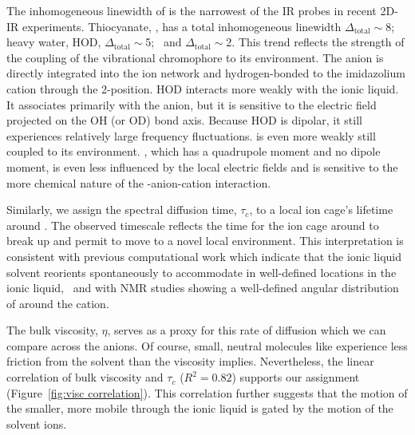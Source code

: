 The inhomogeneous linewidth of  is the narrowest of the IR probes in recent 2D-IR experiments. Thiocyanate, , has a total inhomogeneous linewidth $\Delta_\mathrm{total}\sim$\SI{8}{\wavenumber};\cite{Ren2014} heavy water, HOD, $\Delta_\mathrm{total}\sim$\SI{5}{\wavenumber};~\cite{wongJPCB-13} and  $\Delta_\mathrm{total}\sim$\SI{2}{\wavenumber}. This trend reflects the strength of the coupling of the vibrational chromophore to its environment. The  anion is directly integrated into the ion network and hydrogen-bonded to the imidazolium cation through the 2-position. HOD interacts more weakly with the ionic liquid. It associates primarily with the anion, but it is sensitive to the electric field projected on the OH (or OD) bond axis. Because HOD is dipolar, it still experiences relatively large frequency fluctuations.  is even more weakly still coupled to its environment. , which has a quadrupole moment and no dipole moment, is even less influenced by the local electric fields and is sensitive to the more chemical nature of the -anion-cation interaction.

Similarly, we assign the spectral diffusion time, $\tau_c$, to a local ion cage's lifetime around . The observed timescale reflects the time for the ion cage around  to break up and permit  to move to a novel local environment. This interpretation is consistent with previous computational work which indicate that the ionic liquid solvent reorients spontaneously to accommodate  in well-defined locations in the ionic liquid,~\cite{Huang2005} and with NMR studies showing a well-defined angular distribution of  around the cation.~\cite{Corvo2013}

The bulk viscosity, $\eta$, serves as a proxy for this rate of diffusion which we can compare across the anions. Of course, small, neutral molecules like  experience less friction from the solvent than the viscosity implies.\cite{Kaintz2013,Kaintz2014-corr} Nevertheless, the linear correlation of bulk viscosity and $\tau_c$ ($R^2 = 0.82$)  supports our assignment (Figure~\ref{fig:visc correlation}). This correlation further suggests that the motion of the smaller, more mobile  through the ionic liquid is gated by the motion of the solvent ions.

